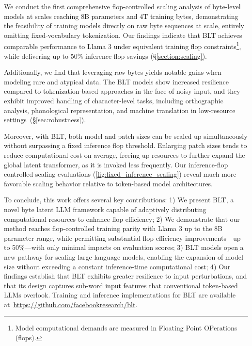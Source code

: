 We conduct the first comprehensive flop-controlled scaling analysis of byte-level models at scales reaching 8B parameters and 4T training bytes, demonstrating the feasibility of training models directly on raw byte sequences at scale, entirely omitting fixed-vocabulary tokenization. Our findings indicate that {\textsc BLT} achieves comparable performance to Llama 3 under equivalent training flop constraints\footnote{Model computational demands are measured in Floating Point OPerations (flops).}, while delivering up to 50\% inference flop savings (\S\ref{section:scaling}). 

Additionally, we find that leveraging raw bytes yields notable gains when modeling rare and atypical data. The {\textsc BLT} models show increased resilience compared to tokenization-based approaches in the face of noisy input, and they exhibit improved handling of character-level tasks, including orthographic analysis, phonological representation, and machine translation in low-resource settings~(\S\ref{sec:robustness}).

Moreover, with {\textsc BLT}, both model and patch sizes can be scaled up simultaneously without surpassing a fixed inference flop threshold. Enlarging patch sizes tends to reduce computational cost on average, freeing up resources to further expand the global latent transformer, as it is invoked less frequently. Our inference-flop controlled scaling evaluations (\autoref{fig:fixed_inference_scaling}) reveal much more favorable scaling behavior relative to token-based model architectures.

To conclude, this work offers several key contributions: 1) We present {\textsc BLT}, a novel byte latent LLM framework capable of adaptively distributing computational resources to enhance flop efficiency; 2) We demonstrate that our method reaches flop-controlled training parity with Llama 3 up to the 8B parameter range, while permitting substantial flop efficiency improvements—up to 50\%—with only minimal impacts on evaluation scores; 3) {\textsc BLT} models open a new pathway for scaling large language models, enabling the expansion of model size without exceeding a constant inference-time computational cost; 4) Our findings establish that {\textsc BLT} exhibits greater resilience to input perturbations, and that its design captures sub-word input features that conventional token-based LLMs overlook. Training and inference implementations for {\textsc BLT} are available at~\url{https://github.com/facebookresearch/blt}.

